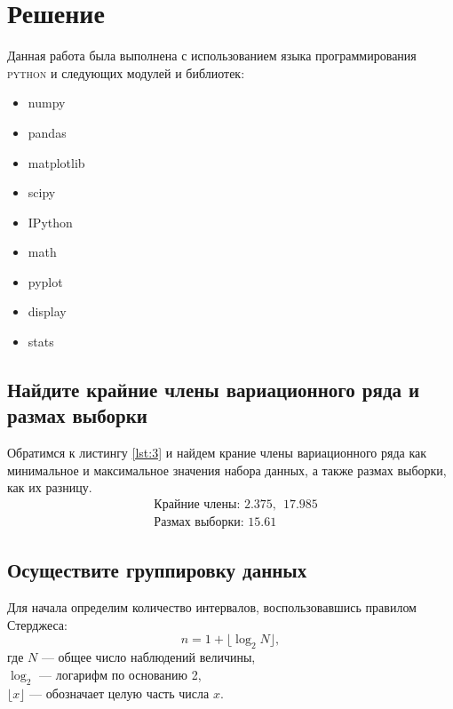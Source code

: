 \documentclass[a4paper, 14pt]{extarticle}
\begin{document}
\newpage

\section{Решение}
Данная работа была выполнена с использованием языка программирования 
\textsc{python} и следующих модулей и библиотек: 

\renewcommand{\labelitemi}{\scalebox{0.5}{$\bullet$}}

\begin{center}
    \begin{multicols}{4}
        \begin{itemize}[itemsep=0pt]
            \item numpy
            \item pandas
            \item matplotlib
            \item scipy
            \item IPython
            \item math
            \item pyplot
            \item display
            \item stats
        \end{itemize}
    \end{multicols}
\end{center}

\subsection{Найдите крайние члены вариационного ряда и размах выборки}

Обратимся к листингу \ref{lst:3} и найдем крание члены вариационного ряда 
как минимальное и максимальное значения набора данных, а также размах выборки, 
как их разницу.
\begin{align*}
    & \text{Крайние члены: }  2.375, \hspace{5pt} 17.985 \\
    & \text{Размах выборки: }  15.61
\end{align*}

\subsection{Осуществите группировку данных}

Для начала определим количество интервалов, воспользовавшись правилом
Стерджеса:
\begin{equation*}
    n = 1 + \lfloor \log_2 N \rfloor,
\end{equation*}
где $N$ — общее число наблюдений величины, \\ 
$\log_2$ — логарифм по основанию 2, \\
$\lfloor x \rfloor$ — обозначает целую часть числа $x$. \\
\end{document}
